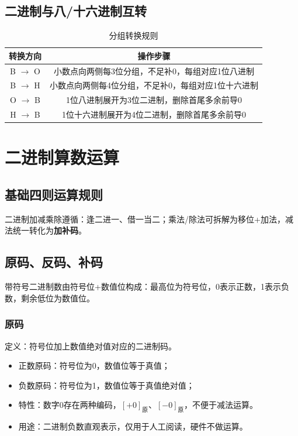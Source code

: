 \subsection{二进制与八/十六进制互转}
\begin{table}[!htbp]
    \centering
    \setlength{\tabcolsep}{12pt}
    \renewcommand{\arraystretch}{1.3}
    \caption{分组转换规则}
    \label{tab:bin_group_rule}
    \begin{tabular}{|c|c|}
        \hline
        转换方向 & 操作步骤 \\
        \hline
        B $\to$ O & 小数点向两侧每3位分组，不足补0，每组对应1位八进制 \\
        B $\to$ H & 小数点向两侧每4位分组，不足补0，每组对应1位十六进制 \\
        O $\to$ B & 1位八进制展开为3位二进制，删除首尾多余前导0 \\
        H $\to$ B & 1位十六进制展开为4位二进制，删除首尾多余前导0 \\
        \hline
    \end{tabular}
\end{table}

\section{二进制算数运算}
\subsection{基础四则运算规则}
二进制加减乘除遵循：逢二进一、借一当二；乘法/除法可拆解为移位+加法，减法统一转化为\textbf{加补码}。

\subsection{原码、反码、补码}
带符号二进制数由符号位+数值位构成：最高位为符号位，0表示正数，1表示负数，剩余低位为数值位。
\subsubsection{原码}
定义：符号位加上数值绝对值对应的二进制码。
\begin{itemize}
    \item 正数原码：符号位为0，数值位等于真值；
    \item 负数原码：符号位为1，数值位等于真值绝对值；
    \item 特性：数字0存在两种编码，$[+0]_{\text{原}}$、$[-0]_{\text{原}}$，不便于减法运算。
    \item 用途：二进制负数直观表示，仅用于人工阅读，硬件不做运算。
\end{itemize}


